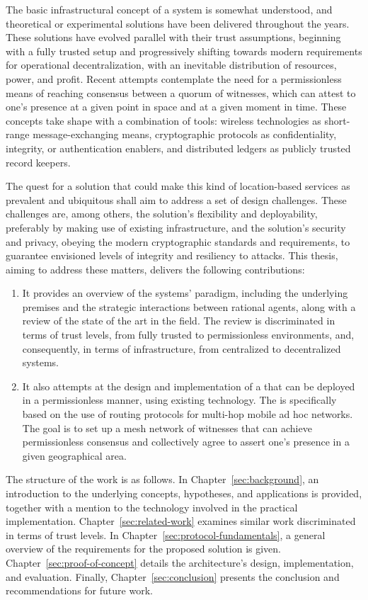 The basic infrastructural concept of a \pol{} system is somewhat understood, and theoretical or experimental solutions have been delivered throughout the years. These solutions have evolved parallel with their trust assumptions, beginning with a fully trusted setup and progressively shifting towards modern requirements for operational decentralization, with an inevitable distribution of resources, power, and profit. Recent attempts contemplate the need for a permissionless means of reaching consensus between a quorum of witnesses, which can attest to one's presence at a given point in space and at a given moment in time. These concepts take shape with a combination of tools: wireless technologies as short-range message-exchanging means, cryptographic protocols as confidentiality, integrity, or authentication enablers, and distributed ledgers as publicly trusted record keepers. 

The quest for a solution that could make this kind of location-based services as prevalent and ubiquitous shall aim to address a set of design challenges. These challenges are, among others, the solution's flexibility and deployability, preferably by making use of existing infrastructure, and the solution's security and privacy, obeying the modern cryptographic standards and requirements, to guarantee envisioned levels of integrity and resiliency to attacks. This thesis, aiming to address these matters, delivers the following contributions:
\begin{enumerate}
\item It provides an overview of the \pol{} systems' paradigm, including the underlying premises and the strategic interactions between rational agents, along with a review of the state of the art in the field. The review is discriminated in terms of trust levels, from fully trusted to permissionless environments, and, consequently, in terms of infrastructure, from centralized to decentralized systems.
\item It also attempts at the design and implementation of a \poc{} that can be deployed in a permissionless manner, using existing technology. The \poc{} is specifically based on the use of routing protocols for multi-hop mobile ad hoc networks. The goal is to set up a mesh network of witnesses that can achieve permissionless consensus and collectively agree to assert one's presence in a given geographical area.
\end{enumerate}

The structure of the work is as follows. In Chapter~\ref{sec:background}, an introduction to the underlying concepts, hypotheses, and applications is provided, together with a mention to the technology involved in the practical implementation. Chapter~\ref{sec:related-work} examines similar work discriminated in terms of trust levels. In Chapter~\ref{sec:protocol-fundamentals}, a general overview of the requirements for the proposed solution is given. Chapter~\ref{sec:proof-of-concept} details the architecture's design, implementation, and evaluation. Finally, Chapter~\ref{sec:conclusion} presents the conclusion and recommendations for future work.
